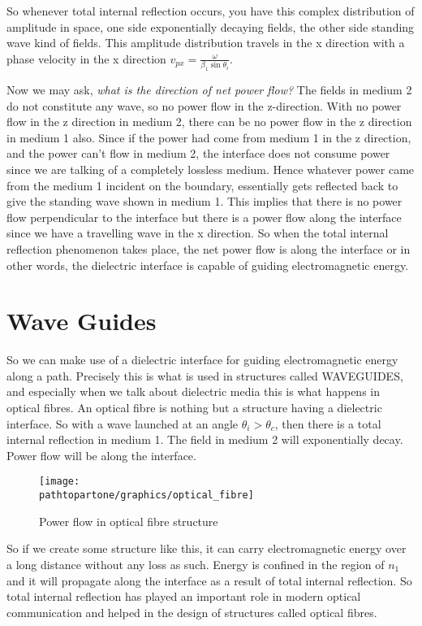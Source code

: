 So whenever total internal reflection occurs, you have this complex distribution of amplitude in space, one side exponentially decaying fields, the other side standing wave kind of fields. This amplitude distribution travels in the x direction with a phase velocity in the x direction $v_{px} = \frac{\omega}{\beta_1\sin\theta_i}$.

Now we may ask, \emph{what is the direction of net power flow?} The fields in medium 2 do not constitute any wave, so no power flow in the z-direction. With no power flow in the z direction in medium 2, there can be no power flow in the z direction in medium 1 also. Since if the power had come from medium 1 in the z direction, and the power can't flow in medium 2, the interface does not consume power since we are talking of a completely lossless medium. Hence whatever power came from the medium 1 incident on the boundary, essentially gets reflected back to give the standing wave shown in medium 1. This implies that there is no power flow perpendicular to the interface but there is a power flow along the interface since we have a travelling wave in the x direction. So when the total internal reflection phenomenon takes place, the net power flow is along the interface or in other words, the dielectric interface is capable of guiding electromagnetic energy.

\section{Wave Guides}

So we can make use of a dielectric interface for guiding electromagnetic energy along a path. Precisely this is what is used in structures called WAVEGUIDES, and especially when we talk about dielectric media this is what happens in optical fibres. An optical fibre is nothing but a structure having a dielectric interface. So with a wave launched at an angle $\theta_i > \theta_c$,
then there is a total internal reflection in medium 1. The field in medium 2 will exponentially decay. Power flow will be along the interface.

\begin{figure}[h]
\centering
\texttt{[image: \\pathtopartone/graphics/optical\_fibre]}
\caption{Power flow in optical fibre structure}
\label{fig:optical_fibre}
\end{figure}

So if we create some structure like this, it can carry electromagnetic energy over a long distance without any loss as such. Energy is confined in the region of $n_1$ and it will propagate along the interface as a result of total internal reflection. So total internal reflection has played an important role in modern optical communication and helped in the design of structures called optical fibres. 


